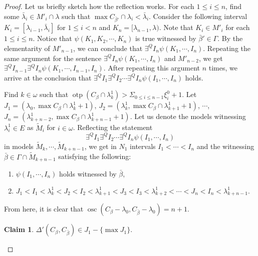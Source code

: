 \documentclass[12pt]{amsart}
\theoremstyle{definition}
\newtheorem{claim}[definition]{Claim}
\theoremstyle{plain}
\theoremstyle{plain}
\DeclareMathOperator{\otp}{otp}
\DeclareMathOperator{\osc}{osc}
\begin{document}
\begin{proof}
Let us briefly sketch how the reflection works. For each $1\leq i \leq n$, find some $\bar{\lambda}_i\in M'_i\cap \lambda$ such that $\max C_{\bar{\beta}'}\cap \lambda_i<\bar{\lambda}_i$. Consider the following interval $K_i=[\lambda_{i-1}, \bar{\lambda}_i]$ for $1\leq i < n$ and $K_n=[\lambda_{n-1},\lambda)$. Note that $K_i\in M'_i$ for each $1\leq i\leq n$. Notice that $\psi(K_1,K_2, \cdots, K_n)$ is true witnessed by $\bar{\beta}' \in \Gamma$. By the elementarity of $M'_{n-1}$, we can conclude that $\exists^Q I_n \psi(K_1,\cdots, I_n)$. Repeating the same argument for the sentence $\exists^Q I_n \psi(K_1,\cdots, I_n)$ and $M'_{n-2}$, we get $\exists^Q I_{n-1}\exists^Q I_n \psi(K_1,\cdots, I_{n-1},I_n)$. After repeating this argument $n$ times, we arrive at the conclusion that $\exists^Q I_1 \exists^Q I_2 \cdots  \exists^Q I_n \psi(I_1,\cdots, I_n)$ holds.



Find $k\in \omega$ such that $\otp(C_\beta\cap \lambda^1_k)> \Sigma_{0\leq i\leq n-1} \xi^0_{i}+1$.
Let $J_1 = (\lambda_0, \max C_{\beta}\cap \lambda_k^1+1)$, $J_2 = (\lambda_k^1, \max C_{\beta}\cap \lambda_{k+1}^1+1)$, $\cdots$, \linebreak $J_n = (\lambda_{k+n-2}^1, \max C_{\beta}\cap \lambda_{k+n-1}^1+1)$. Let us denote the models witnessing $\lambda_i^1\in E$ as $\tilde{M}_i$ for $i\in \omega$. Reflecting the statement $$\exists^Q I_1 \exists^Q I_2 \cdots  \exists^Q I_n \psi(I_1,\cdots, I_n)$$ in models $\tilde{M}_k, \cdots, \tilde{M}_{k+n-1}$, we get in $N_1$ intervals $I_1<\cdots<I_n$ and the witnessing $\bar{\beta}\in \Gamma\cap \tilde{M}_{k+n-1}$ satisfying the following:  
\begin{enumerate}
\item $\psi(I_1,\cdots, I_n)$ holds witnessed by $\bar{\beta}$, 
\item $J_1<I_1<\lambda_k^1 <J_2 < I_2<\lambda_{k+1}^1< J_3 < I_3 <\lambda_{k+2}^1 <\cdots < J_n<I_n< \lambda_{k+n-1}^1$.
\end{enumerate}


From here, it is clear that $\osc(C_{\beta}-\lambda_0, C_{\bar{\beta}}-\lambda_0)=n+1$. 

	\begin{claim}\label{claim: computedeltaprime}
	$\Delta'(C_{\beta}, C_{\bar{\beta}})\in J_1-\{\max J_1\}$.
	\end{claim}
	

\end{proof}
\end{document}
